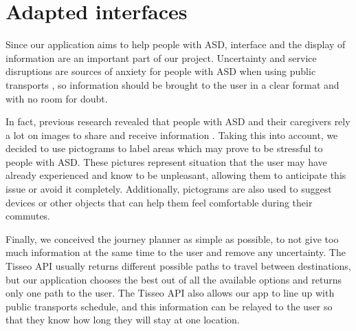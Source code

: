 \section{Adapted interfaces}

Since our application aims to help people with ASD, interface and the display of information are an important part of our project. Uncertainty and service disruptions are sources of anxiety for people with ASD when using public transports \cite{2020ExperiencesYoungAutistic}, so information should be brought to the user in a clear format and with no room for doubt.\newline

In fact, previous research revealed that people with ASD and their caregivers rely a lot on images to share and receive information \cite{2018MobilityPoliciesExtraSmall}. Taking this into account, we decided to use pictograms to label areas which may prove to be stressful to people with ASD. These pictures represent situation that the user may have already experienced and know to be unpleasant, allowing them to anticipate this issue or avoid it completely. Additionally, pictograms are also used to suggest devices or other objects that can help them feel comfortable during their commutes.\newline 

Finally, we conceived the journey planner as simple as possible, to not give too much information at the same time to the user and remove any uncertainty. The Tisseo API usually returns different possible paths to travel between destinations, but our application chooses the best out of all the available options and returns only one path to the user. The Tisseo API also allows our app to line up with public transports schedule, and this information can be relayed to the user so that they know how long they will stay at one location.
